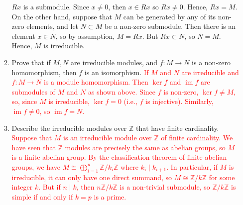 \documentclass[12pt]{article}
\newcommand{\bbZ}{\mathbb{Z}}
\newcommand{\im}{\operatorname{im}}
\newcommand{\solution}[1]{\textcolor{red}{#1}}
\begin{document}
\begin{enumerate}
\begin{enumerate}
{  $Rx$ is a submodule. Since $x\neq 0$, then $x\in Rx$ so $Rx\neq
  0$. Hence, $Rx=M$. On the other hand, suppose that $M$ can be
  generated by any of its non-zero elements, and let $N\subset M$ be a
  non-zero submodule. Then there is an element $x\in N$, so by
  assumption, $M=Rx$. But $Rx\subset N$, so $N=M$. Hence, $M$ is irreducible.}
  \item Prove that if $M, N$ are irreducible modules, and
    $f:M\rightarrow N$ is a non-zero homomorphism, then $f$ is an
    isomorphism.
\solution{If $M$ and $N$ are irreducible and $f: M\rightarrow N$ is a
  module homomorphism. Then $\ker f$ and $\im f$ are submodules of $M$
  and $N$ as shown above. Since $f$ is non-zero, $\ker f \neq M$, so,
  since $M$ is irreducible, $\ker f=0$ (i.e., $f$ is
  injective). Similarly, $\im f\neq 0$, so $\im f = N$.}
  \item Describe the irreducible modules over $\bbZ$ that have finite
    cardinality. 
\solution{
Suppose that $M$ is an irreducible module over $\bbZ$ of finite
cardinality. We have seen that $\bbZ$ modules are precisely the same
as abelian groups, so $M$ is a finite abelian group. By the
classification theorem of finite abelian groups, we have $M\cong
\bigoplus\limits_{i=1}^u \bbZ/k_i\bbZ$ where $k_i \mid k_{i+1}$. In
particular, if $M$ is irreducible, it can only have one direct
summand, so $M\cong \bbZ/k \bbZ$ for some integer $k$. But if $n\mid
k$, then $n\bbZ/k\bbZ$ is a non-trivial submodule, so $\bbZ/k\bbZ$ is
simple if and only if $k=p$ is a prime. }
  \end{enumerate}


\end{enumerate}
\end{document}
